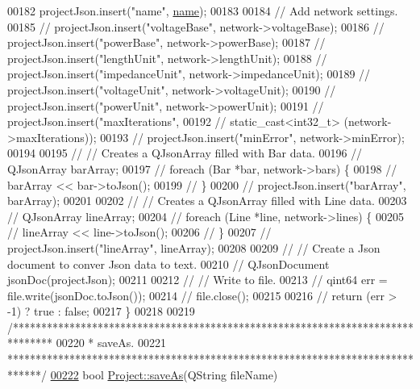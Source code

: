 \begin{DoxyCode}
00182   projectJson.insert(\textcolor{stringliteral}{"name"}, \hyperlink{class_project_a82dd2d1bc38f9fd08c9a811fcaa76b38}{name});
00183 
00184   \textcolor{comment}{// Add network settings.}
00185 \textcolor{comment}{//  projectJson.insert("voltageBase", network->voltageBase);}
00186 \textcolor{comment}{//  projectJson.insert("powerBase", network->powerBase);}
00187 \textcolor{comment}{//  projectJson.insert("lengthUnit", network->lengthUnit);}
00188 \textcolor{comment}{//  projectJson.insert("impedanceUnit", network->impedanceUnit);}
00189 \textcolor{comment}{//  projectJson.insert("voltageUnit", network->voltageUnit);}
00190 \textcolor{comment}{//  projectJson.insert("powerUnit", network->powerUnit);}
00191 \textcolor{comment}{//  projectJson.insert("maxIterations",}
00192 \textcolor{comment}{//                     static\_cast<int32\_t> (network->maxIterations));}
00193 \textcolor{comment}{//  projectJson.insert("minError", network->minError);}
00194 
00195 \textcolor{comment}{//  // Creates a QJsonArray filled with Bar data.}
00196 \textcolor{comment}{//  QJsonArray barArray;}
00197 \textcolor{comment}{//  foreach (Bar *bar, network->bars) \{}
00198 \textcolor{comment}{//    barArray << bar->toJson();}
00199 \textcolor{comment}{//  \}}
00200 \textcolor{comment}{//  projectJson.insert("barArray", barArray);}
00201 
00202 \textcolor{comment}{//  // Creates a QJsonArray filled with Line data.}
00203 \textcolor{comment}{//  QJsonArray lineArray;}
00204 \textcolor{comment}{//  foreach (Line *line, network->lines) \{}
00205 \textcolor{comment}{//    lineArray << line->toJson();}
00206 \textcolor{comment}{//  \}}
00207 \textcolor{comment}{//  projectJson.insert("lineArray", lineArray);}
00208 
00209 \textcolor{comment}{//  // Create a Json document to conver Json data to text.}
00210 \textcolor{comment}{//  QJsonDocument jsonDoc(projectJson);}
00211 
00212 \textcolor{comment}{//  // Write to file.}
00213 \textcolor{comment}{//  qint64 err = file.write(jsonDoc.toJson());}
00214 \textcolor{comment}{//  file.close();}
00215 
00216 \textcolor{comment}{//  return (err > -1) ? true : false;}
00217 \}
00218 
00219 \textcolor{comment}{/*******************************************************************************}
00220 \textcolor{comment}{ * saveAs.}
00221 \textcolor{comment}{ ******************************************************************************/}
\hypertarget{project_8cpp_source_l00222}{}\hyperlink{class_project_ad32a31d548ad38f4cbbe0f95879a68e5}{00222} \textcolor{keywordtype}{bool} \hyperlink{class_project_ad32a31d548ad38f4cbbe0f95879a68e5}{Project::saveAs}(QString fileName)

\end{DoxyCode}
